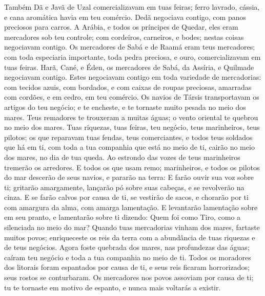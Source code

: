 {  Também Dã e Javã de Uzal comercializavam em tuas feiras; ferro lavrado, cássia, e cana aromática havia em teu comércio.
  Dedã negociava contigo, com panos preciosos para carros.
  A Arábia, e todos os príncipes de Quedar, eles eram mercadores sob teu controle; com cordeiros, carneiros, e bodes; nestas coisas negociavam contigo.
  Os mercadores de Sabá e de Raamá eram teus mercadores; com toda especiaria importante, toda pedra preciosa, e ouro, comercializavam em tuas feiras.
  Harã, Cané, e Éden, os mercadores de Sabá, da Assíria, e Quilmade negociavam contigo.
  Estes negociavam contigo em toda variedade de mercadorias: com tecidos azuis, com bordados, e com caixas de roupas preciosas, amarradas com cordões, e
{} em cedro, em teu comércio.
  Os navios de Társis transportavam os artigos do teu negócio; e te encheste, e te tornaste muito pesada no meio dos mares.
  Teus remadores te trouxeram a muitas águas; o vento oriental te quebrou no meio dos mares.
  Tuas riquezas, tuas feiras, teu negócio, teus marinheiros, teus pilotos; os que reparavam tuas fendas, teus comerciantes, e todos teus soldados que há em ti, com toda a tua companhia que está no meio de ti, cairão no meio dos mares, no dia de tua queda.
  Ao estrondo das vozes de teus marinheiros tremerão os arredores.
  E todos os que usam remo; marinheiros, e todos os pilotos do mar descerão de seus navios, e pararão na terra:
  E farão ouvir sua voz sobre ti; gritarão amargamente, lançarão pó sobre suas cabeças, e se revolverão na cinza.
  E se farão calvos por causa de ti, se vestirão de sacos, e chorarão por ti com amargura da alma, com amarga lamentação.
  E levantarão lamentação sobre em seu pranto, e lamentarão sobre ti dizendo: Quem foi como Tiro, como a
{} silenciada no meio do mar?
  Quando tuas mercadorias vinham dos mares, fartaste muitos povos; enriqueceste os reis da terra com a abundância de tuas riquezas e de teus negócios.
  Agora foste quebrada dos mares, nas profundezas das águas; caíram teu negócio e toda a tua companhia no meio de ti.
  Todos os moradores dos litorais foram espantados por causa de ti, e seus reis ficaram horrorizados; seus rostos se conturbaram.
  Os mercadores nos povos assoviam por causa de ti; tu te tornaste em motivo de espanto, e nunca mais voltarás a existir.
\par }

